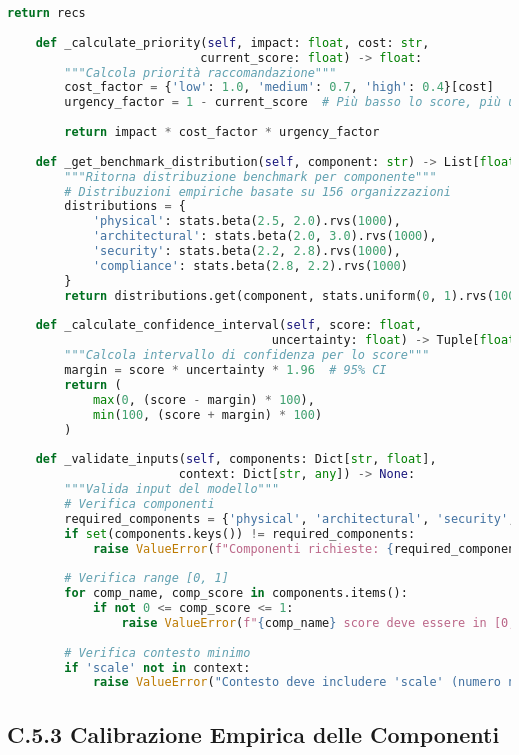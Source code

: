 \begin{lstlisting}[language=Python, caption=Classe GISTFramework Completa]
        return recs
    
    def _calculate_priority(self, impact: float, cost: str, 
                           current_score: float) -> float:
        """Calcola priorità raccomandazione"""
        cost_factor = {'low': 1.0, 'medium': 0.7, 'high': 0.4}[cost]
        urgency_factor = 1 - current_score  # Più basso lo score, più urgente
        
        return impact * cost_factor * urgency_factor
    
    def _get_benchmark_distribution(self, component: str) -> List[float]:
        """Ritorna distribuzione benchmark per componente"""
        # Distribuzioni empiriche basate su 156 organizzazioni
        distributions = {
            'physical': stats.beta(2.5, 2.0).rvs(1000),
            'architectural': stats.beta(2.0, 3.0).rvs(1000),
            'security': stats.beta(2.2, 2.8).rvs(1000),
            'compliance': stats.beta(2.8, 2.2).rvs(1000)
        }
        return distributions.get(component, stats.uniform(0, 1).rvs(1000))
    
    def _calculate_confidence_interval(self, score: float, 
                                     uncertainty: float) -> Tuple[float, float]:
        """Calcola intervallo di confidenza per lo score"""
        margin = score * uncertainty * 1.96  # 95% CI
        return (
            max(0, (score - margin) * 100),
            min(100, (score + margin) * 100)
        )
    
    def _validate_inputs(self, components: Dict[str, float], 
                        context: Dict[str, any]) -> None:
        """Valida input del modello"""
        # Verifica componenti
        required_components = {'physical', 'architectural', 'security', 'compliance'}
        if set(components.keys()) != required_components:
            raise ValueError(f"Componenti richieste: {required_components}")
        
        # Verifica range [0, 1]
        for comp_name, comp_score in components.items():
            if not 0 <= comp_score <= 1:
                raise ValueError(f"{comp_name} score deve essere in [0, 1]")
        
        # Verifica contesto minimo
        if 'scale' not in context:
            raise ValueError("Contesto deve includere 'scale' (numero negozi)")
\end{lstlisting}

\subsection{\texorpdfstring{\textbf{C.5.3 Calibrazione Empirica delle Componenti}}{C.5.3 - Calibrazione Empirica delle Componenti}}

